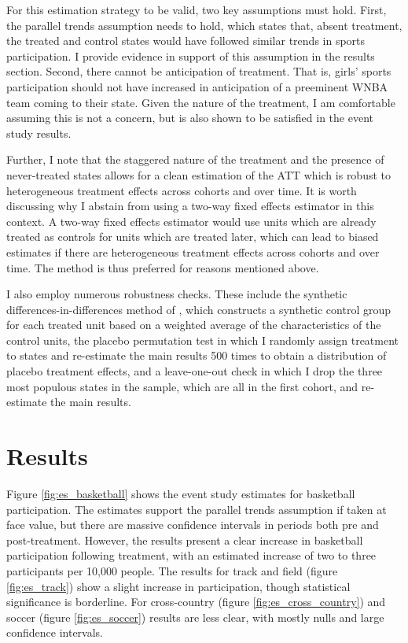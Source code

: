 \documentclass[11pt]{article}
\newcommand{\1}[1]{\mathbb{I}\{#1\}}
\theoremstyle{plain}
\begin{document}
For this estimation strategy to be valid, two key assumptions must hold. First, the parallel trends assumption needs to hold, which states that, absent treatment, the treated and control states would have followed similar trends in sports participation. I provide evidence in support of this assumption in the results section. Second, there cannot be anticipation of treatment. That is, girls' sports participation should not have increased in anticipation of a preeminent WNBA team coming to their state. Given the nature of the treatment, I am comfortable assuming this is not a concern, but is also shown to be satisfied in the event study results. 

Further, I note that the staggered nature of the treatment and the presence of never-treated states allows for a clean estimation of the ATT which is robust to heterogeneous treatment effects across cohorts and over time. It is worth discussing why I abstain from using a two-way fixed effects estimator in this context. A two-way fixed effects estimator would use units which are already treated as controls for units which are treated later, which can lead to biased estimates if there are heterogeneous treatment effects across cohorts and over time. The \cite{csa_2021} method is thus preferred for reasons mentioned above. 

I also employ numerous robustness checks. These include the synthetic differences-in-differences method of \cite{arkhangelsky_synthetic_2021}, which constructs a synthetic control group for each treated unit based on a weighted average of the characteristics of the control units, the placebo permutation test in which I randomly assign treatment to states and re-estimate the main results 500 times to obtain a distribution of placebo treatment effects, and a leave-one-out check in which I drop the three most populous states in the sample, which are all in the first cohort, and re-estimate the main results.

\section{Results}

Figure \ref{fig:es_basketball} shows the event study estimates for basketball participation. The estimates support the parallel trends assumption if taken at face value, but there are massive confidence intervals in periods both pre and post-treatment. However, the results present a clear increase in basketball participation following treatment, with an estimated increase of two to three participants per 10,000 people. The results for track and field (figure \ref{fig:es_track}) show a slight increase in participation, though statistical significance is borderline. For cross-country (figure \ref{fig:es_cross_country}) and soccer (figure \ref{fig:es_soccer}) results are less clear, with mostly nulls and large confidence intervals. 
\end{document}
